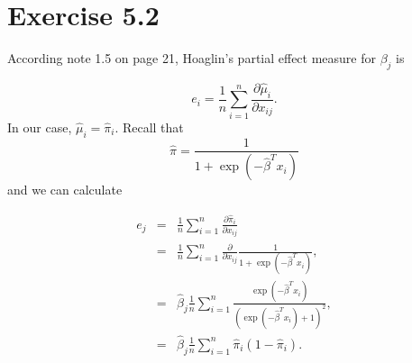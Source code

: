\section*{Exercise 5.2}

According note 1.5 on page 21, Hoaglin's partial effect measure for
$\beta_{j}$ is

\[
e_{i}=\frac{1}{n}\sum_{i=1}^{n}\frac{\partial\hat{\mu}_{i}}{\partial x_{ij}}.
\]
In our case, $\hat{\mu}_{i}=\hat{\pi}_{i}$. Recall that 
\[
\hat{\pi}=\frac{1}{1+\exp\left(-\hat{\beta}^{T}x_{i}\right)}
\]
and we can calculate

\begin{eqnarray*}
e_{j} & = & \frac{1}{n}\sum_{i=1}^{n}\frac{\partial\hat{\pi}_{i}}{\partial x_{ij}}\\
 & = & \frac{1}{n}\sum_{i=1}^{n}\frac{\partial}{\partial x_{ij}}\frac{1}{1+\exp\left(-\hat{\beta}^{T}x_{i}\right)},\\
 & = & \hat{\beta}_{j}\frac{1}{n}\sum_{i=1}^{n}\frac{\exp\left(-\hat{\beta}^{T}x_{i}\right)}{\left(\exp\left(-\hat{\beta}^{T}x_{i}\right)+1\right)^{2}},\\
 & = & \hat{\beta}_{j}\frac{1}{n}\sum_{i=1}^{n}\hat{\pi}_{i}(1-\hat{\pi}_{i}).
\end{eqnarray*}
